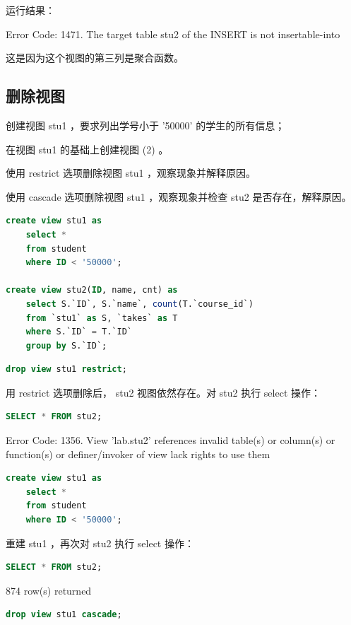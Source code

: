 \documentclass{article}
\begin{document}
运行结果：

Error Code: 1471. The target table stu2 of the INSERT is not insertable-into

这是因为这个视图的第三列是聚合函数。

\subsection{删除视图}

创建视图 stu1 ，要求列出学号小于 '50000' 的学生的所有信息；

在视图 stu1 的基础上创建视图 (2) 。

使用 restrict 选项删除视图 stu1 ，观察现象并解释原因。

使用 cascade 选项删除视图 stu1 ，观察现象并检查 stu2 是否存在，解释原因。

\begin{lstlisting}[language=sql]
create view stu1 as
	select * 
	from student
	where ID < '50000';

create view stu2(ID, name, cnt) as
	select S.`ID`, S.`name`, count(T.`course_id`)
    from `stu1` as S, `takes` as T
    where S.`ID` = T.`ID`
    group by S.`ID`;
\end{lstlisting}

\begin{lstlisting}[language=sql]
drop view stu1 restrict;
\end{lstlisting}

用 restrict 选项删除后， stu2 视图依然存在。对 stu2 执行 select 操作：

\begin{lstlisting}[language=sql]
SELECT * FROM stu2;
\end{lstlisting}

Error Code: 1356. View 'lab.stu2' references invalid table(s) or column(s) or function(s) or definer/invoker of view lack rights to use them

\begin{lstlisting}[language=sql]
create view stu1 as
	select * 
	from student
	where ID < '50000';
\end{lstlisting}

重建 stu1 ，再次对 stu2 执行 select 操作：

\begin{lstlisting}[language=sql]
SELECT * FROM stu2;
\end{lstlisting}

874 row(s) returned

\begin{lstlisting}[language=sql]
drop view stu1 cascade;
\end{lstlisting}
\end{document}
